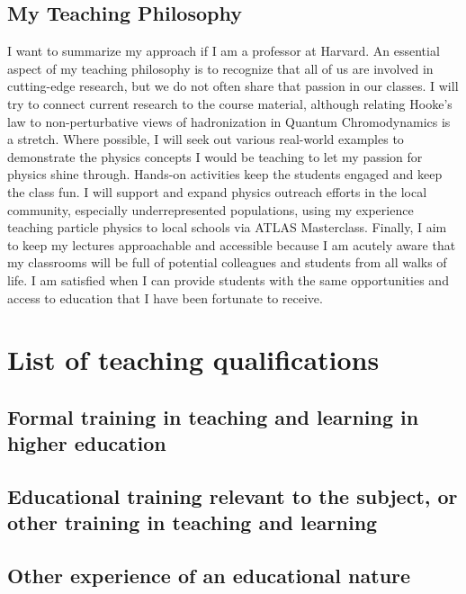 \subsection{My Teaching Philosophy} \label{ssec:my-teaching-philosophy}
I want to summarize my approach if I am a professor at Harvard. An essential aspect of my teaching philosophy is to recognize that all of us are involved in cutting-edge research, but we do not often share that passion in our classes. I will try to connect current research to the course material, although relating Hooke's law to non-perturbative views of hadronization in Quantum Chromodynamics is a stretch. Where possible, I will seek out various real-world examples to demonstrate the physics concepts I would be teaching to let my passion for physics shine through. Hands-on activities keep the students engaged and keep the class fun. I will support and expand physics outreach efforts in the local community, especially underrepresented populations, using my experience teaching particle physics to local schools via ATLAS Masterclass. Finally, I aim to keep my lectures approachable and accessible because I am acutely aware that my classrooms will be full of potential colleagues and students from all walks of life. I am satisfied when I can provide students with the same opportunities and access to education that I have been fortunate to receive.

\section{List of teaching qualifications} \label{sec:list-of-teaching-qualifications}

\subsection{Formal training in teaching and learning in higher education \none}\label{ssec:formal-training-in-teaching-and-learning-in-higher-education-none}
\subsection{Educational training relevant to the subject, or other training in teaching and learning \none}\label{ssec:educational-training-relevant-to-the-subject-or-other-training-in-teaching-and-learning-none}
\subsection{Other experience of an educational nature \none}\label{ssec:other-experience-of-an-educational-nature-none}
